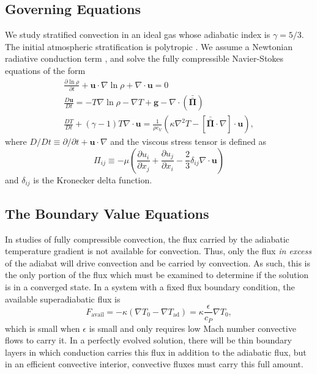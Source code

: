 \documentclass[aps, pre, onecolumn, nofootinbib, notitlepage, groupedaddress, amsfonts, amssymb, amsmath, longbibliography]{revtex4-1}
\newcommand{\Div}[1]{\ensuremath{\nabla\cdot\left( #1\right)}}
\newcommand{\DivU}{\ensuremath{\nabla\cdot\bm{u}}}
\newcommand{\grad}{\ensuremath{\nabla}}
\newcommand{\stressT}{\ensuremath{\bm{\bar{\bar{\Pi}}}}}
\begin{document}
\subsection{Governing Equations}
We study stratified convection in an ideal gas whose adiabatic index is $\gamma = 5/3$.
The initial atmospheric stratification is polytropic \cite{anders&brown2017}.
We assume a Newtonian radiative conduction term \cite{lecoanet&all2014}, and solve the
fully compressible Navier-Stokes equations of the form
\begin{gather}
\frac{\partial \ln \rho}{\partial t} + \bm{u}\cdot\grad\ln\rho + \DivU = 0
	\label{eqn:FC_continuity}
\\
\frac{D \bm{u}}{Dt} = -T\grad\ln\rho - \grad T + \bm{g} - \Div{\stressT}
	\label{eqn:FC_momentum}
\\
\frac{D T}{D t} + (\gamma-1)T\DivU = 
\frac{1}{\rho c_V}\left(\kappa\grad^2 T - [\stressT\cdot\grad]\cdot\bm{u}\right),
	\label{eqn:FC_energy}
\end{gather}
where $D/Dt \equiv \partial/\partial t + \bm{u}\cdot\grad$ and the viscous stress
tensor is defined as
\begin{equation}
\Pi_{ij} \equiv -\mu\left(\frac{\partial u_i}{\partial x_j} + \frac{\partial u_j}{\partial x_i} - \frac{2}{3}\delta_{ij
}\DivU\right)
\label{eqn:stress_tensor}
\end{equation}
and $\delta_{ij}$ is the Kronecker delta function.

\subsection{The Boundary Value Equations}
In studies of fully compressible convection, the flux carried by the adiabatic temperature gradient
is not available for convection.  Thus, only the flux \emph{in excess} of the adiabat will drive
convection and be carried by convection.  As such, this is the only portion of the flux which
must be examined to determine if the solution is in a converged state.  In a system with
a fixed flux boundary condition, the available superadiabatic flux is
\begin{equation}
F_{\text{avail}} = -\kappa(\grad T_0 - \grad T_{\text{ad}}) = \kappa\frac{\epsilon}{c_P}\grad T_0,
\end{equation}
which is small when $\epsilon$ is small and only requires low Mach number convective flows
to carry it.  In a perfectly evolved solution, there will be thin boundary layers in which
conduction carries this flux in addition to the adiabatic flux, but in an efficient convective
interior, convective fluxes must carry this full amount.
\end{document}
